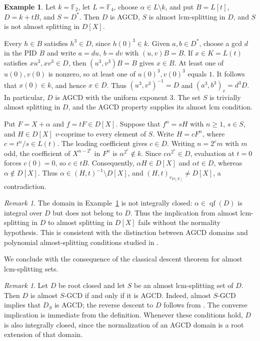\documentclass[11pt]{amsart}
\theoremstyle{definition}
\newtheorem{example}[theorem]{Example}
\theoremstyle{remark}
\newtheorem{remark}[theorem]{Remark}
\DeclareMathOperator{\qf}{qf}
\begin{document}
\begin{example}\label{e:splitting-needs-normality}
Let $k=\mathbb F_2$, let $L=\mathbb F_4$, choose
$\alpha\in L\setminus k$, and put $B=L[t]$, $D=k+tB$,
and $S=D^\ast$. Then $D$ is AGCD, $S$ is almost lcm-splitting
in $D$, and $S$ is not almost splitting in $D[X]$.

Every $h\in B$ satisfies $h^3\in D$, since $h(0)^3\in k$.
Given $a,b\in D^\ast$, choose a gcd $d$ in the PID $B$ and
write $a=du$, $b=dv$ with $(u,v)B=B$.
If $x\in K=L(t)$ satisfies $xu^3,xv^3\in D$, then
$(u^3,v^3)B=B$ gives $x\in B$.
At least one of $u(0),v(0)$ is nonzero, so at least one of
$u(0)^3,v(0)^3$ equals $1$. It follows that $x(0)\in k$,
and hence $x\in D$.
Thus $(u^3,v^3)^{-1}=D$ and
$(a^3,b^3)_v=d^3D$. In particular, $D$ is AGCD with the
uniform exponent $3$. The set $S$ is trivially almost
splitting in $D$, and the AGCD property supplies its almost
lcm condition.

Put $F=X+\alpha$ and $f=tF\in D[X]$.
Suppose that $f^n=sH$ with $n\geq1$, $s\in S$, and
$H\in D[X]$ $v$-coprime to every element of $S$.
Write $H=cF^n$, where $c=t^n/s\in L(t)$.
The leading coefficient gives $c\in D$.
Writing $n=2^em$ with $m$ odd, the coefficient of
$X^{n-2^e}$ in $F^n$ is $\alpha^{2^e}\notin k$.
Since $c\alpha^{2^e}\in D$, evaluation at $t=0$ forces
$c(0)=0$, so $c\in tB$.
Consequently, $\alpha H\in D[X]$ and $\alpha t\in D$,
whereas $\alpha\notin D[X]$.
Thus $\alpha\in(H,t)^{-1}\setminus D[X]$, and
$(H,t)_{v_{D[X]}}\ne D[X]$, a contradiction.
\end{example}

\begin{remark}\label{r:integrally-closed-needed-q7}
The domain in Example~\ref{e:splitting-needs-normality} is not
integrally closed: $\alpha\in\qf(D)$ is integral over $D$ but
does not belong to $D$.
Thus the implication from almost lcm-splitting in $D$ to
almost splitting in $D[X]$ fails without the normality
hypothesis. This is consistent with the distinction between
AGCD domains and polynomial almost-splitting conditions
studied in \cite{AndersonChang2007}.
\end{remark}

We conclude with the consequence of the classical descent theorem
for almost lcm-splitting sets.

\begin{remark}\label{r:root-closed-lcm}
Let $D$ be root closed and let $S$ be an almost lcm-splitting
set of $D$. Then $D$ is almost $S$-GCD if and only if it is AGCD.
Indeed, almost $S$-GCD implies that $D_S$ is AGCD; the reverse
descent to $D$ follows from \cite[Corollary~2.10]{ATZ}.
The converse implication is immediate from the definition.
Whenever these conditions hold, $D$ is also integrally closed,
since the normalization of an AGCD domain is a root extension
of that domain.
\end{remark}
\end{document}
